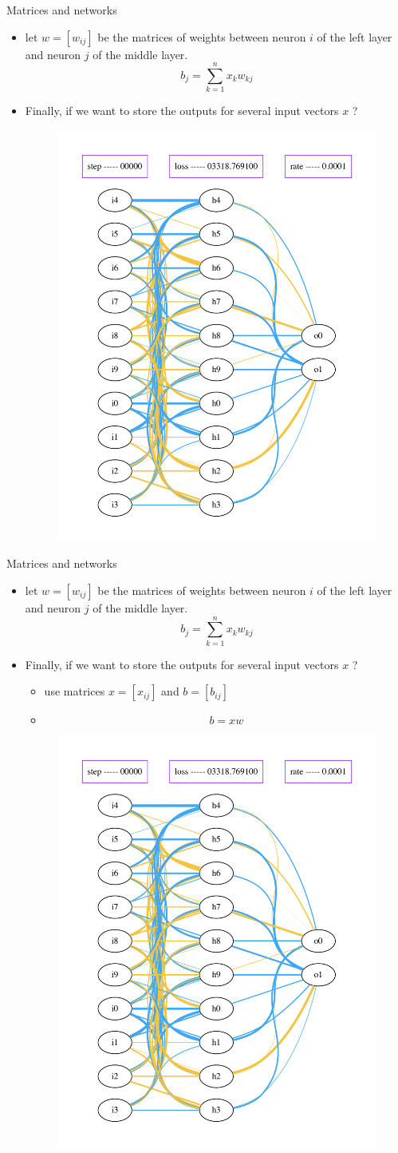 \documentclass{beamer}
\begin{document}
\begin{frame}{Matrices and networks}
    \begin{itemize}
        \item let $w=[w_{ij}]$ be the matrices of weights between neuron $i$ of
            the left layer and neuron $j$ of the middle layer.
            \begin{equation}
                b_j= \sum^{n}_{k=1}x_kw_{kj} 
            \end{equation}
        \item Finally, if we want to store the outputs for several input
            vectors $x$ ?
            \begin{figure}[htpb]
                \centering
                \includegraphics[width=0.1\linewidth]{net_0}
                \label{fig:name}
            \end{figure}
    \end{itemize}
\end{frame}



\begin{frame}{Matrices and networks}
    \begin{itemize}
        \item let $w=[w_{ij}]$ be the matrices of weights between neuron $i$ of
            the left layer and neuron $j$ of the middle layer.
            \begin{equation}
                b_j= \sum^{n}_{k=1}x_kw_{kj} 
            \end{equation}
        \item Finally, if we want to store the outputs for several input
            vectors $x$ ?
            \begin{itemize}
                \item use matrices  $x=[x_{ij}]$ and $b=[b_{ij}]$
                \item \begin{equation}
                        b=xw
                \end{equation}
            \end{itemize}
            \begin{figure}[htpb]
                \centering
                \includegraphics[width=0.1\linewidth]{net_0}
                \label{fig:name}
            \end{figure}
    \end{itemize}
\end{frame}
\end{document}
